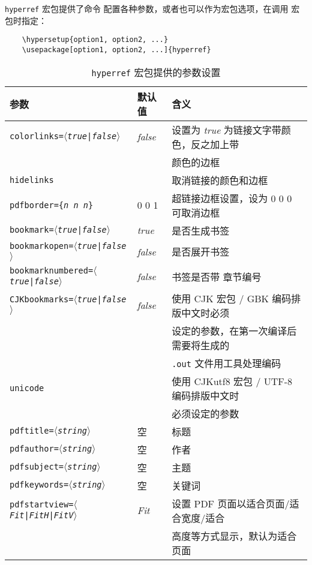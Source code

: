 \documentclass[UTF8]{ctexart}
\begin{document}
\texttt{hyperref} 宏包提供了命令 \texttt{\hypersetup} 配置各种参数，或者也可以作为宏包选项，在调用
宏包时指定：
\begin{verbatim}
    \hypersetup{option1, option2, ...}
    \usepackage[option1, option2, ...]{hyperref}
\end{verbatim}

\begin{table}[H]
\caption{\texttt{hyperref} 宏包提供的参数设置}
\label{tab:hyperref}
\begin{center}
\begin{tabular}{@{}lll@{}}
    \hline
    \textbf{参数} & \textbf{默认值} & \textbf{含义} \\ \hline
    \texttt{colorlinks=$\langle$\emph{true}|\emph{false}$\rangle$} & \emph{false} & 设置为
    \emph{true} 为链接文字带颜色，反之加上带 \\ & & 颜色的边框 \\
    \texttt{hidelinks} & & 取消链接的颜色和边框 \\
    \texttt{pdfborder=\{\emph{n} \emph{n} \emph{n}\}} & 0 0 1 & 超链接边框设置，设为 0 0 0 可取消边框 \\
    \hline
    \texttt{bookmark=$\langle$\emph{true}|\emph{false}$\rangle$} & \emph{true} & 是否生成书签 \\
    \texttt{bookmarkopen=$\langle$\emph{true}|\emph{false}$\rangle$} & \emph{false} & 是否展开书签 \\
    \texttt{bookmarknumbered=$\langle$\emph{true}|\emph{false}$\rangle$} & \emph{false} & 书签是否带
    章节编号 \\
    \texttt{CJKbookmarks=$\langle$\emph{true}|\emph{false}$\rangle$} & \emph{false} & 使用 CJK 宏包 /
    GBK 编码排版中文时必须 \\ & & 设定的参数，在第一次编译后需要将生成的 \\ & & \texttt{.out} 文件用工具处理编码 \\
    \texttt{unicode} & & 使用 CJKutf8 宏包 / UTF-8 编码排版中文时 \\ & & 必须设定的参数 \\ \hline
    \texttt{pdftitle=$\langle$\emph{string}$\rangle$} & 空 & 标题 \\
    \texttt{pdfauthor=$\langle$\emph{string}$\rangle$} & 空 & 作者 \\
    \texttt{pdfsubject=$\langle$\emph{string}$\rangle$} & 空 & 主题 \\
    \texttt{pdfkeywords=$\langle$\emph{string}$\rangle$} & 空 & 关键词 \\
    \texttt{pdfstartview=$\langle$\emph{Fit}|\emph{FitH}|\emph{FitV}$\rangle$} & \emph{Fit} & 设置
    PDF 页面以适合页面/适合宽度/适合 \\ & & 高度等方式显示，默认为适合页面 \\ \hline
\end{tabular}
\end{center}
\end{table}
\end{document}
